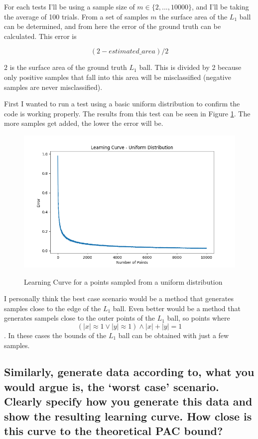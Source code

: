 \documentclass[11pt,a4paper]{article}
\begin{document}
For each tests I'll be using a sample size of $m \in \{2, ... , 10000 \}$, and I'll be taking the average of 100 trials. From a set of samples $m$ the surface area of the  $L_1$ ball can be determined, and from here the error of the ground truth can be calculated. This error is 

\[(2 - \textit{estimated\_area}) / 2\]

$2$ is the surface area of the ground truth $L_1$ ball. This is divided by 2 because only positive samples that fall into this area will be misclassified (negative samples are never misclassified).

First I wanted to run a test using a basic uniform distribution to confirm the code is working properly. The results from this test can be seen in Figure \ref{fig:learningcurve_uniform}. The more samples get added, the lower the error will be.

\begin{figure}[h]
    \caption{Learning Curve for a points sampled from a uniform distribution}
    \centering
    \includegraphics[width=\textwidth]{learningcurve_uniform.png}
    \label{fig:learningcurve_uniform}
\end{figure}

I personally think the best case scenario would be a method that generates samples close to the edge of the $L_1$ ball. Even better would be a method that generates sampels close to the outer points of the $L_1$ ball, so points where \[(|x| \approx 1 \lor |y| \approx 1) \land |x| + |y| = 1\]. In these cases the bounds of the $L_1$ ball can be obtained with just a few samples.

\subsection{Similarly, generate data according to, what you would argue is, the ‘worst case’ scenario. Clearly specify how you generate this data and show the resulting learning curve. How close is this curve to the theoretical PAC bound?}
\end{document}
